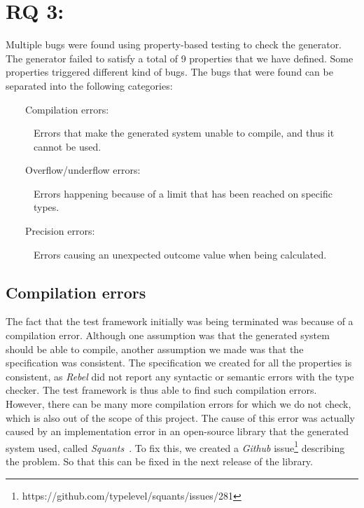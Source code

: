 \section{RQ 3: \rqThree{}}
Multiple bugs were found using property-based testing to check the generator.
The generator failed to satisfy a total of 9 properties that we have defined.
Some properties triggered different kind of bugs. The bugs that were found can
be separated into the following categories:
\begin{description}
  \item[~~~~Compilation errors:] Errors that make the generated system unable to compile, and thus it cannot be used.
  \item[~~~~Overflow/underflow errors:] Errors happening because of a limit that has been reached on specific types.
  \item[~~~~Precision errors:] Errors causing an unexpected outcome value when being calculated.
\end{description}
\subsection*{Compilation errors}
The fact that the test framework initially was being terminated was because of a
compilation error. Although one assumption was that the generated system should
be able to compile, another assumption we made was that the specification was
consistent. The specification we created for all the properties is consistent,
as \textit{Rebel} did not report any syntactic or semantic errors with the type
checker. The test framework is thus able to find such compilation errors. However,
there can be many more compilation errors for which we do not check, which is
also out of the scope of this project. The cause of this error was actually
caused by an implementation error in an open-source library that the generated
system used, called \textit{Squants}~\cite{siteSquants2017}. To fix this, we
created a \textit{Github}
issue\footnote{https://github.com/typelevel/squants/issues/281} describing the
problem. So that this can be fixed in the next release of the library.

